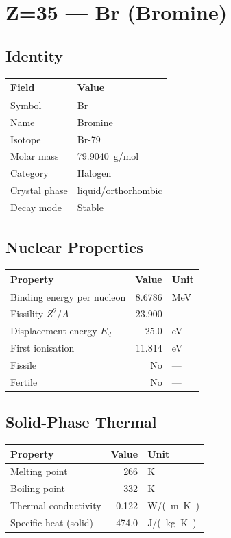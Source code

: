 \documentclass[11pt,a4paper]{article}
\begin{document}
\newpage

\section{Z=35 --- Br (Bromine)}
\label{sec:Z35}

\subsection{Identity}
\begin{tabular}{ll}
  \toprule
  Field & Value \\
  \midrule
  Symbol & Br \\
  Name & Bromine \\
  Isotope & Br-79 \\
  Molar mass & \SI{79.9040}{g/mol} \\
  Category & Halogen \\
  Crystal phase & liquid/orthorhombic \\
  Decay mode & Stable \\
  \bottomrule
\end{tabular}

\subsection{Nuclear Properties}
\begin{tabular}{lrl}
  \toprule
  Property & Value & Unit \\
  \midrule
  Binding energy per nucleon & 8.6786 & \si{MeV} \\
  Fissility $Z^2/A$ & 23.900 & --- \\
  Displacement energy $E_d$ & 25.0 & \si{eV} \\
  First ionisation & 11.814 & \si{eV} \\
  Fissile & No & --- \\
  Fertile & No & --- \\
  \bottomrule
\end{tabular}

\subsection{Solid-Phase Thermal}
\begin{tabular}{lrl}
  \toprule
  Property & Value & Unit \\
  \midrule
  Melting point & 266 & \si{K} \\
  Boiling point & 332 & \si{K} \\
  Thermal conductivity & 0.122 & \si{W/(m.K)} \\
  Specific heat (solid) & 474.0 & \si{J/(kg.K)} \\
  \bottomrule
\end{tabular}
\end{document}
